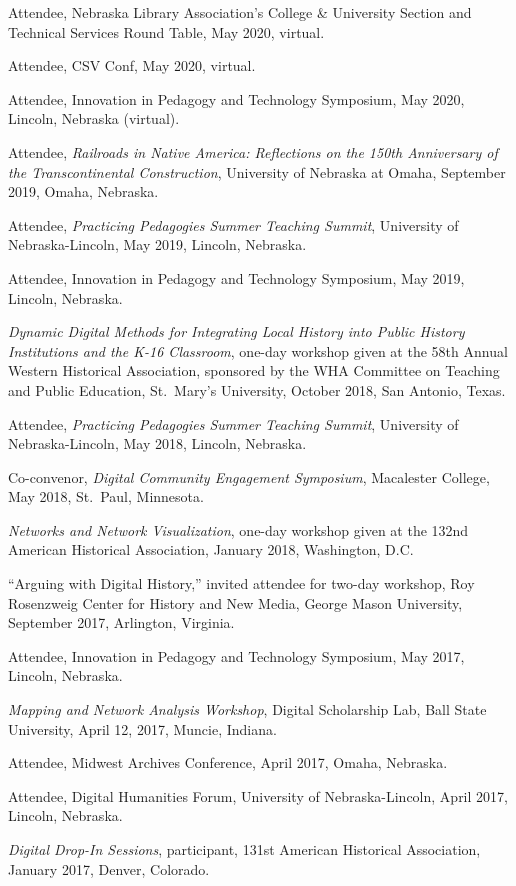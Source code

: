 Attendee, Nebraska Library Association's College \& University Section
and Technical Services Round Table, May 2020, virtual.

Attendee, CSV Conf, May 2020, virtual.

Attendee, Innovation in Pedagogy and Technology Symposium, May 2020,
Lincoln, Nebraska (virtual).

Attendee, \emph{Railroads in Native America: Reflections on the 150th
Anniversary of the Transcontinental Construction}, University of
Nebraska at Omaha, September 2019, Omaha, Nebraska.

Attendee, \emph{Practicing Pedagogies Summer Teaching Summit},
University of Nebraska-Lincoln, May 2019, Lincoln, Nebraska.

Attendee, Innovation in Pedagogy and Technology Symposium, May 2019,
Lincoln, Nebraska.

\emph{Dynamic Digital Methods for Integrating Local History into Public
History Institutions and the K-16 Classroom}, one-day workshop given at
the 58th Annual Western Historical Association, sponsored by the WHA
Committee on Teaching and Public Education, St.~Mary's University,
October 2018, San Antonio, Texas.

Attendee, \emph{Practicing Pedagogies Summer Teaching Summit},
University of Nebraska-Lincoln, May 2018, Lincoln, Nebraska.

Co-convenor, \emph{Digital Community Engagement Symposium}, Macalester
College, May 2018, St.~Paul, Minnesota.

\emph{Networks and Network Visualization}, one-day workshop given at the
132nd American Historical Association, January 2018, Washington, D.C.

``Arguing with Digital History,'' invited attendee for two-day workshop,
Roy Rosenzweig Center for History and New Media, George Mason
University, September 2017, Arlington, Virginia.

Attendee, Innovation in Pedagogy and Technology Symposium, May 2017,
Lincoln, Nebraska.

\emph{Mapping and Network Analysis Workshop}, Digital Scholarship Lab,
Ball State University, April 12, 2017, Muncie, Indiana.

Attendee, Midwest Archives Conference, April 2017, Omaha, Nebraska.

Attendee, Digital Humanities Forum, University of Nebraska-Lincoln,
April 2017, Lincoln, Nebraska.

\emph{Digital Drop-In Sessions}, participant, 131st American Historical
Association, January 2017, Denver, Colorado.


